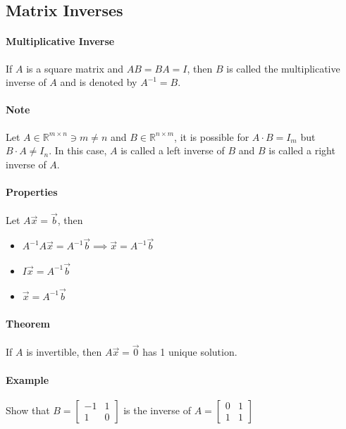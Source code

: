 \subsection{Matrix Inverses}
\hrulefill

\paragraph*{Multiplicative Inverse}
If $A$ is a square matrix and $AB = BA = I$, then $B$ is called the multiplicative inverse of $A$ and is denoted by $A^{-1} = B$.

\paragraph*{Note} Let $A \in \mathbb{R}^{m \times n} \ni m \neq n$ and $B \in \mathbb{R}^{n \times m}$, it is possible for 
$A \cdot B = I_m$ but $B \cdot A \neq I_n$. In this case, $A$ is called a left inverse of $B$ and $B$ is called a right inverse of $A$.

\paragraph*{Properties}
Let $A\vec{x} = \vec{b}$, then
\begin{itemize}
    \item $A^{-1}A\vec{x} = A^{-1}\vec{b} \implies \vec{x} = A^{-1}\vec{b}$
    \item $I\vec{x} = A^{-1}\vec{b}$
    \item $\vec{x} = A^{-1}\vec{b}$
\end{itemize}

\paragraph*{Theorem} 
If $A$ is invertible, then $A\vec{x} = \vec{0}$ has 1 unique solution.

\paragraph*{Example} Show that $B = \begin{bmatrix}
    -1 & 1 \\
    1 & 0
\end{bmatrix}$ is the inverse of $A = \begin{bmatrix}
    0 & 1 \\
    1 & 1
\end{bmatrix}$

